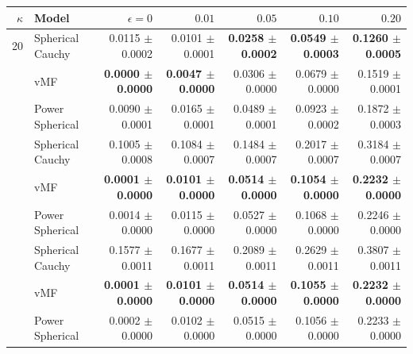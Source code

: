 \begin{tabular}{rlrrrrr}
\toprule
$\kappa$ & Model & $\epsilon=0$ & $0.01$ & $0.05$ & $0.10$ & $0.20$ \\
\midrule
20 & Spherical Cauchy & 0.0115 $\pm$ 0.0002 & 0.0101 $\pm$ 0.0001 & \textbf{0.0258 $\pm$ 0.0002} & \textbf{0.0549 $\pm$ 0.0003} & \textbf{0.1260 $\pm$ 0.0005} \\
 & vMF & \textbf{0.0000 $\pm$ 0.0000} & \textbf{0.0047 $\pm$ 0.0000} & 0.0306 $\pm$ 0.0000 & 0.0679 $\pm$ 0.0000 & 0.1519 $\pm$ 0.0001 \\
 & Power Spherical & 0.0090 $\pm$ 0.0001 & 0.0165 $\pm$ 0.0001 & 0.0489 $\pm$ 0.0001 & 0.0923 $\pm$ 0.0002 & 0.1872 $\pm$ 0.0003 \\
\addlinespace
100 & Spherical Cauchy & 0.1005 $\pm$ 0.0008 & 0.1084 $\pm$ 0.0007 & 0.1484 $\pm$ 0.0007 & 0.2017 $\pm$ 0.0007 & 0.3184 $\pm$ 0.0007 \\
 & vMF & \textbf{0.0001 $\pm$ 0.0000} & \textbf{0.0101 $\pm$ 0.0000} & \textbf{0.0514 $\pm$ 0.0000} & \textbf{0.1054 $\pm$ 0.0000} & \textbf{0.2232 $\pm$ 0.0000} \\
 & Power Spherical & 0.0014 $\pm$ 0.0000 & 0.0115 $\pm$ 0.0000 & 0.0527 $\pm$ 0.0000 & 0.1068 $\pm$ 0.0000 & 0.2246 $\pm$ 0.0000 \\
\addlinespace
500 & Spherical Cauchy & 0.1577 $\pm$ 0.0011 & 0.1677 $\pm$ 0.0011 & 0.2089 $\pm$ 0.0011 & 0.2629 $\pm$ 0.0011 & 0.3807 $\pm$ 0.0011 \\
 & vMF & \textbf{0.0001 $\pm$ 0.0000} & \textbf{0.0101 $\pm$ 0.0000} & \textbf{0.0514 $\pm$ 0.0000} & \textbf{0.1055 $\pm$ 0.0000} & \textbf{0.2232 $\pm$ 0.0000} \\
 & Power Spherical & 0.0002 $\pm$ 0.0000 & 0.0102 $\pm$ 0.0000 & 0.0515 $\pm$ 0.0000 & 0.1056 $\pm$ 0.0000 & 0.2233 $\pm$ 0.0000 \\
\bottomrule
\end{tabular}
